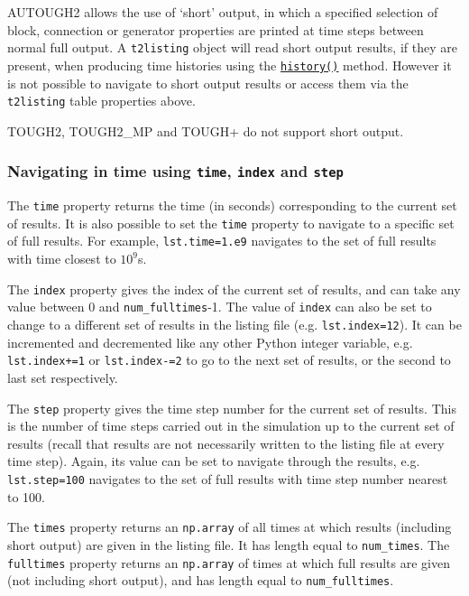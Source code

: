 AUTOUGH2 allows the use of `short' output, in which a specified selection of block, connection or generator properties are printed at time steps between normal full output.  A \texttt{t2listing} object will read short output results, if they are present, when producing time histories using the \hyperref[sec:t2listing:history]{\texttt{history()}} method.  However it is not possible to navigate to short output results or access them via the \texttt{t2listing} table properties above.

TOUGH2, TOUGH2\_MP and TOUGH+ do not support short output.

\subsubsection{Navigating in time using \texttt{time}, \texttt{index} and \texttt{step}}

The \texttt{time} property returns the time (in seconds) corresponding to the current set of results.  It is also possible to set the \texttt{time} property to navigate to a specific set of full results.  For example, \texttt{lst.time=1.e9} navigates to the set of full results with time closest to $10^9$s.

The \texttt{index} property gives the index of the current set of results, and can take any value between 0 and \texttt{num\_fulltimes}-1.  The value of \texttt{index} can also be set to change to a different set of results in the listing file (e.g. \texttt{lst.index=12}).  It can be incremented and decremented like any other Python integer variable, e.g. \texttt{lst.index+=1} or \texttt{lst.index-=2} to go to the next set of results, or the second to last set respectively.

The \texttt{step} property gives the time step number for the current set of results.  This is the number of time steps carried out in the simulation up to the current set of results (recall that results are not necessarily written to the listing file at every time step).  Again, its value can be set to navigate through the results, e.g. \texttt{lst.step=100} navigates to the set of full results with time step number nearest to 100.

The \texttt{times} property returns an \texttt{np.array} of all times at which results (including short output) are given in the listing file.  It has length equal to \texttt{num\_times}.  The \texttt{fulltimes} property returns an \texttt{np.array} of times at which full results are given (not including short output), and has length equal to \texttt{num\_fulltimes}.

